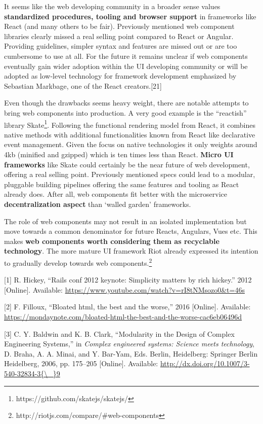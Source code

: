 \documentclass[]{article}
\begin{document}
It seems like the web developing community in a broader sense values
\textbf{standardized procedures, tooling and browser support} in
frameworks like React (and many others to be fair). Previously mentioned
web component libraries clearly missed a real selling point compared to
React or Angular. Providing guidelines, simpler syntax and features are
missed out or are too cumbersome to use at all. For the future it
remains unclear if web components eventually gain wider adoption within
the UI developing community or will be adopted as low-level technology
for framework development emphasized by Sebastian Markbage, one of the
React creators.{[}21{]}

Even though the drawbacks seems heavy weight, there are notable attempts
to bring web components into production. A very good example is the
``reactish'' library Skate\footnote{https://github.com/skatejs/skatejs/}.
Following the functional rendering model from React, it combines native
methods with additional functionalities known from React like
declarative event management. Given the focus on native technologies it
only weights around 4kb (minified and gzipped) which is ten times less
than React. \textbf{Micro UI frameworks} like Skate could certainly be
the near future of web development, offering a real selling point.
Previously mentioned specs could lead to a modular, pluggable building
pipelines offering the same features and tooling as React already does.
After all, web components fit better with the microservice
\textbf{decentralization aspect} than `walled garden' frameworks.

The role of web components may not result in an isolated implementation
but move towards a common denominator for future Reacts, Angulars, Vues
etc. This makes \textbf{web components worth considering them as
recyclable technology}. The more mature UI framework Riot already
expressed its intention to gradually develop towards web
components.\footnote{http://riotjs.com/compare/\#web-components}

\hypertarget{refs}{}
\hypertarget{ref-Hickey2012}{}
{[}1{]} R. Hickey, ``Rails conf 2012 keynote: Simplicity matters by rich
hickey.'' 2012 {[}Online{]}. Available:
\url{https://www.youtube.com/watch?v=rI8tNMsozo0\&t=46s}

\hypertarget{ref-Filloux2016}{}
{[}2{]} F. Filloux, ``Bloated html, the best and the worse,'' 2016
{[}Online{]}. Available:
\url{https://mondaynote.com/bloated-html-the-best-and-the-worse-cac6eb06496d}

\hypertarget{ref-Baldwin2006}{}
{[}3{]} C. Y. Baldwin and K. B. Clark, ``Modularity in the Design of
Complex Engineering Systems,'' in \emph{Complex engineered systems:
Science meets technology}, D. Braha, A. A. Minai, and Y. Bar-Yam, Eds.
Berlin, Heidelberg: Springer Berlin Heidelberg, 2006, pp. 175--205
{[}Online{]}. Available:
\href{http://dx.doi.org/10.1007/3-540-32834-3\%7B/_\%7D9}{http://dx.doi.org/10.1007/3-540-32834-3\{\textbackslash{}\_\}9}
\end{document}
